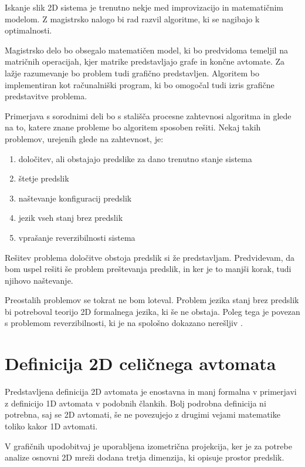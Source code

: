 \documentclass[12pt,a4paper,openany]{book}
\begin{document}
Iskanje slik 2D sistema je trenutno nekje med improvizacijo in matematičnim modelom.
Z magistrsko nalogo bi rad razvil algoritme, ki se nagibajo k optimalnosti.

Magistrsko delo bo obsegalo matematičen model, ki bo predvidoma temeljil na matričnih operacijah,
kjer matrike predstavljajo grafe in končne avtomate.
Za lažje razumevanje bo problem tudi grafično predstavljen.
Algoritem bo implementiran kot računalniški program,
ki bo omogočal tudi izris grafične predstavitve problema.

Primerjava s sorodnimi deli bo s stališča procesne zahtevnosi algoritma in glede na to,
katere znane probleme bo algoritem sposoben rešiti. Nekaj takih problemov, urejenih glede na zahtevnost, je:
\begin{enumerate}
\item določitev, ali obstajajo predslike za dano trenutno stanje sistema
\item štetje predslik
\item naštevanje konfiguracij predslik
\item jezik vseh stanj brez predslik
\item vprašanje reverzibilnosti sistema
\end{enumerate}

Rešitev problema določitve obstoja predslik si že predstavljam. 
Predvidevam, da bom uspel rešiti še problem preštevanja predslik,
in ker je to manjši korak, tudi njihovo naštevanje.

Preostalih problemov se tokrat ne bom loteval.
Problem jezika stanj brez predslik bi potreboval teorijo 2D formalnega jezika, ki še ne obstaja.
Poleg tega je povezan s problemom reverzibilnosti, ki je na spološno dokazano nerešljiv \cite{Kari1989}.

\chapter{Definicija 2D celičnega avtomata}

Predstavljena definicija 2D avtomata je enostavna in manj formalna
v primerjavi z definicijo 1D avtomata v podobnih člankih.
Bolj podrobna definicija ni potrebna, saj se 2D avtomati, še ne povezujejo
z drugimi vejami matematike toliko kakor 1D avtomati.

V grafičnih upodobitvaj je uporabljena izometrična projekcija,
ker je za potrebe analize osnovni 2D mreži dodana tretja dimenzija,
ki opisuje prostor predslik.
\end{document}
